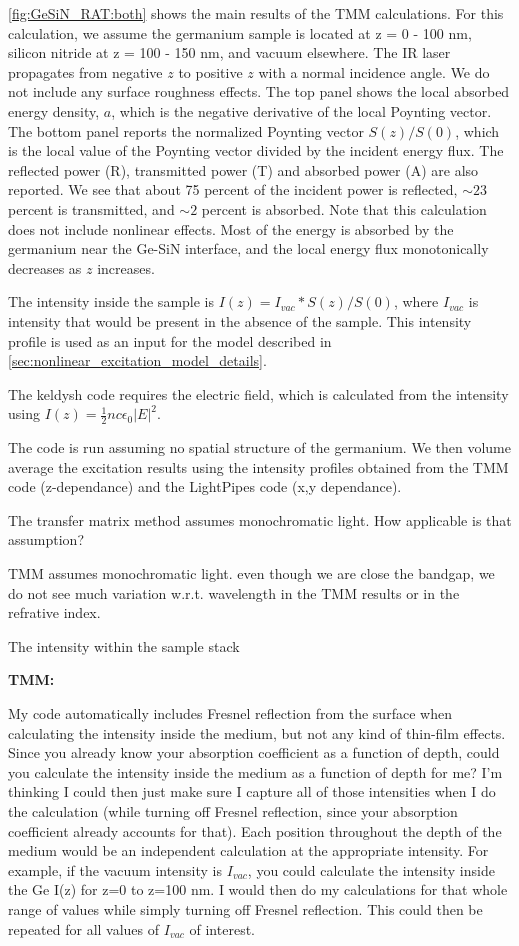 \cref{fig:GeSiN_RAT:both} shows the main results of the TMM calculations. For this calculation, we assume the germanium sample is located at z = 0 - 100 nm, silicon nitride at z = 100 - 150 nm, and vacuum elsewhere. The IR laser propagates from negative $z$ to positive $z$ with a normal incidence angle. We do not include any surface roughness effects. The top panel shows the local absorbed energy density, $a$, which is the negative derivative of the local Poynting vector. The bottom panel reports the normalized Poynting vector $S(z)/S(0)$, which is the local value of the Poynting vector divided by the incident energy flux. The reflected power (R), transmitted power (T) and absorbed power (A) are also reported. We see that about 75 percent of the incident power is reflected, $\sim 23$ percent is transmitted, and $\sim 2$ percent is absorbed. Note that this calculation does not include nonlinear effects. Most of the energy is absorbed by the germanium near the Ge-SiN interface, and the local energy flux monotonically decreases as $z$ increases.

The intensity inside the sample is $I(z) = I_{vac} * S(z) / S(0)$, where $I_{vac}$ is intensity that would be present in the absence of the sample. This intensity profile is used as an input for the model described in \cref{sec:nonlinear_excitation_model_details}.

The keldysh code requires the electric field, which is calculated from the intensity using $I(z)=\frac{1}{2} n c \epsilon_0 |E|^2$.

The code is run assuming no spatial structure of the germanium. We then volume average the excitation results using the intensity profiles obtained from the TMM code (z-dependance) and the LightPipes code (x,y dependance).


The transfer matrix method assumes monochromatic light. How applicable is that assumption?


TMM assumes monochromatic light. even though we are close the bandgap, we do not see much variation w.r.t. wavelength in the TMM results or in the refrative index.


The intensity within the sample stack 




\textbf{TMM:}

My code automatically includes Fresnel reflection from the surface when calculating the intensity inside the medium, but not any kind of thin-film effects. Since you already know your absorption coefficient as a function of depth, could you calculate the intensity inside the medium as a function of depth for me? I'm thinking I could then just make sure I capture all of those intensities when I do the calculation (while turning off Fresnel reflection, since your absorption coefficient already accounts for that). Each position throughout the depth of the medium would be an independent calculation at the appropriate intensity. For example, if the vacuum intensity is $I_{vac}$, you could calculate the intensity inside the Ge I(z) for z=0 to z=100 nm. I would then do my calculations for that whole range of values while simply turning off Fresnel reflection. This could then be repeated for all values of $I_{vac}$ of interest.



